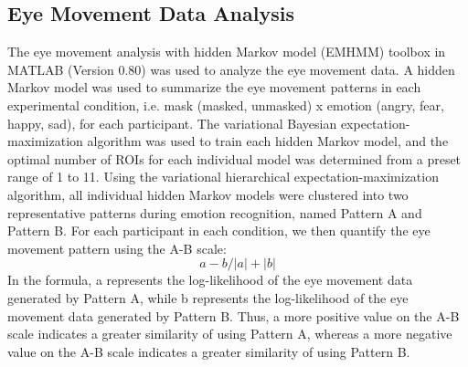 \subsection{Eye Movement Data Analysis}
The eye movement analysis with hidden Markov model (EMHMM) toolbox in MATLAB (Version 0.80) was used to analyze the eye movement data. A hidden Markov model was used to summarize the eye movement patterns in each experimental condition, i.e. mask (masked, unmasked) x emotion (angry, fear, happy, sad), for each participant. The variational Bayesian expectation-maximization algorithm was used to train each hidden Markov model, and the optimal number of ROIs for each individual model was determined from a preset range of 1 to 11. Using the variational hierarchical expectation-maximization algorithm, all individual hidden Markov models were clustered into two representative patterns during emotion recognition, named Pattern A and Pattern B. For each participant in each condition, we then quantify the eye movement pattern using the A-B scale: 
\begin{equation} \label{eq3}
{a-b}/ | a | + | b | 
\end{equation}
In the formula, a represents the log-likelihood of the eye movement data generated by Pattern A, while b represents the log-likelihood of the eye movement data generated by Pattern B. Thus, a more positive value on the A-B scale indicates a greater similarity of using Pattern A, whereas a more negative value on the A-B scale indicates a greater similarity of using Pattern B.
